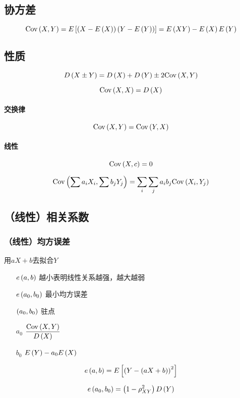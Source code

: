 \documentclass{article}
\begin{document}
\subsection{协方差}

\[\cov XY=E\left[\p{X-E\p{X}}\p{Y-E\p{Y}}\right]=E\p{XY}-E\p{X}E\p{Y}\]

\subsection{性质}

\[D\p{X\pm Y}=D\p{X}+D\p{Y}\pm2\cov XY\]

\[\cov XX=D\p{X}\]

\paragraph{交换律}

\[\cov XY=\cov YX\]

\paragraph{线性}

\[\cov Xc=0\]

\[\cov{\sum a_iX_i}{\sum b_jY_j}=\sum_i\sum_ja_ib_j\cov{X_i}{Y_j}\]

\subsection{（线性）相关系数}

\subsubsection{（线性）均方误差}

用$aX+b$去拟合$Y$

\begin{enumerate}
    \item [$e\p{a,b}$] 越小表明线性关系越强，越大越弱
    \item [$e\p{a_0,b_0}$] 最小均方误差
    \item [$\p{a_0,b_0}$] 驻点
    \item [$a_0$] $\dfrac{\cov XY}{D\p{X}}$
    \item [$b_0$] $E\p{Y}-a_0E\p{X}$
\end{enumerate}

\[e\p{a,b}=E\left[{\p{Y-\p{aX+b}}}^2\right]\]

\[e\p{a_0,b_0}=\p{1-\rho^2_{XY}}D\p{Y}\]
\end{document}

